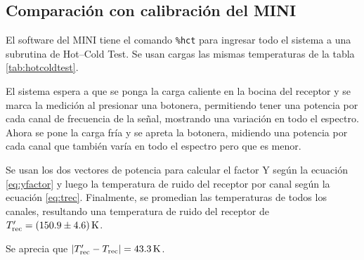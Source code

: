 \subsection{Comparación con calibración del MINI}\label{sec:calibracion}

El software del MINI tiene el comando \texttt{\%hct} para ingresar todo el sistema a una subrutina de Hot--Cold Test. Se usan cargas las mismas temperaturas de la tabla \ref{tab:hotcoldtest}.

El sistema espera a que se ponga la carga caliente en la bocina del receptor y se marca la medición al presionar una botonera, permitiendo tener una potencia por cada canal de frecuencia de la señal, mostrando una variación en todo el espectro. Ahora se pone la carga fría y se apreta la botonera, midiendo una potencia por cada canal que también varía en todo el espectro pero que es menor.

Se usan los dos vectores de potencia para calcular el factor Y según la ecuación \ref{eq:yfactor} y luego la temperatura de ruido del receptor por canal según la ecuación \ref{eq:trec}. Finalmente, se promedian las temperaturas de todos los canales, resultando una temperatura de ruido del receptor de $T_\textnormal{rec}'=\SI[separate-uncertainty=true]{150.9(46)}{\kelvin}$.

Se aprecia que $\abs{T_\textnormal{rec}'-T_\textnormal{rec}}=\SI{43.3}{\kelvin}$.
